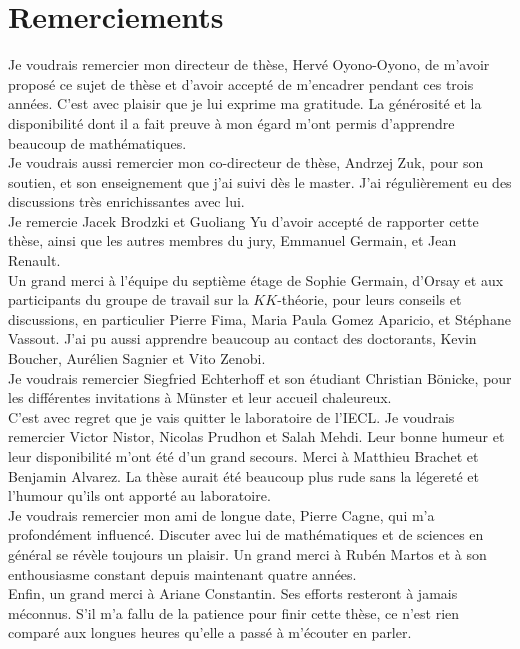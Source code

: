 \section*{Remerciements}

Je voudrais remercier mon directeur de thèse, Hervé Oyono-Oyono, de m'avoir proposé ce sujet de thèse et d'avoir accepté de m'encadrer pendant ces trois années. C'est avec plaisir que je lui exprime ma gratitude. La générosité et la disponibilité dont il a fait preuve à mon égard m'ont permis d'apprendre beaucoup de mathématiques.\\%

Je voudrais aussi remercier mon co-directeur de thèse, Andrzej Zuk, pour son soutien, et son enseignement que j'ai suivi dès le master. J'ai régulièrement eu des discussions très enrichissantes avec lui.\\

Je remercie Jacek Brodzki et Guoliang Yu d'avoir accepté de rapporter cette thèse, ainsi que les autres membres du jury, Emmanuel Germain, et Jean Renault.\\   

Un grand merci à l'équipe du septième étage de Sophie Germain, d'Orsay et aux participants du groupe de travail sur la $KK$-théorie, pour leurs conseils et discussions, en particulier Pierre Fima, Maria Paula Gomez Aparicio, et Stéphane Vassout. J'ai pu aussi apprendre beaucoup au contact des doctorants, Kevin Boucher, Aurélien Sagnier et Vito Zenobi. \\

Je voudrais remercier Siegfried Echterhoff et son étudiant Christian Bönicke, pour les différentes invitations à Münster et leur accueil chaleureux.\\

C'est avec regret que je vais quitter le laboratoire de l'IECL. Je voudrais remercier Victor Nistor, Nicolas Prudhon et Salah Mehdi. Leur bonne humeur et leur disponibilité m'ont été d'un grand secours. Merci à Matthieu Brachet et Benjamin Alvarez. La thèse aurait été beaucoup plus rude sans la légereté et l'humour qu'ils ont apporté au laboratoire. \\

Je voudrais remercier mon ami de longue date, Pierre Cagne, qui m'a profondément influencé. Discuter avec lui de mathématiques et de sciences en général se révèle toujours un plaisir. Un grand merci à Rubén Martos et à son enthousiasme constant depuis maintenant quatre années. \\

Enfin, un grand merci à Ariane Constantin. Ses efforts resteront à jamais méconnus. S'il m'a fallu de la patience pour finir cette thèse, ce n'est rien comparé aux longues heures qu'elle a passé à m'écouter en parler.\\   


